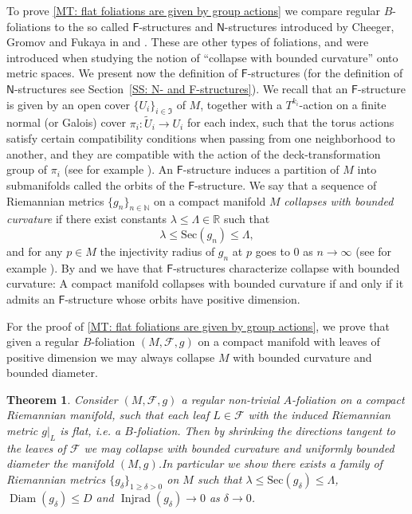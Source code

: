 \documentclass[12pt,a4paper,reqno]{amsart}
\newtheorem{mtheorem}{Theorem}
\theoremstyle{definition}
\numberwithin{equation}{section}
\newcommand{\fol}{\mathcal{F}}
\newcommand{\F}{\mathsf{F}}
\newcommand{\N}{\mathbb{N}} %
\newcommand{\Ns}{\mathsf{N}}
\newcommand{\R}{\mathbb{R}} %
\newcommand{\Sec}{\mathrm{Sec}}
\DeclareMathOperator{\diam}{Diam}
\DeclareMathOperator{\Inj}{Injrad}
\begin{document}
To prove \th\ref{MT: flat foliations are given by group actions} we compare regular $B$-foliations to the  so called $\F$-structures and $\Ns$-structures introduced by Cheeger, Gromov and Fukaya in \cite{CheegerGromov1986} and \cite{CheegerFukayaGromov1992}.  These are other types of foliations, and were introduced  when studying the notion of  ``collapse with bounded curvature'' onto metric spaces. We present now the definition of $\F$-structures (for the definition of $\Ns$-structures see Section~\ref{SS: N- and F-structures}). We recall that an $\F$-structure is given by an open cover $\{U_i\}_{i\in \mathfrak{I}}$ of $M$, together with a $T^{k_i}$-action on a finite  normal (or Galois) cover $\pi_i\colon \tilde{U}_i\to U_i$ for each index, such that the torus actions satisfy certain compatibility conditions when passing from one neighborhood to another, and they are compatible with the action of the deck-transformation group of $\pi_i$ (see for example \cite[Definition 19.2]{Fukaya1990}). An $\F$-structure induces a partition of $M$ into submanifolds called the orbits of the $\F$-structure. We say that a sequence of Riemannian metrics $\{g_n\}_{n\in \N}$ on a compact manifold $M$ \emph{collapses with bounded curvature} if there exist constants $\lambda\leq \Lambda\in \R$ such that
\[
\lambda\leq \Sec(g_n)\leq \Lambda,
\]
and for any $p\in M$ the injectivity radius of $g_n$ at $p$ goes to $0$ as $n\to \infty$ (see for example \cite[p. 69]{Pansu1985}). By \cite{CheegerGromov1986} and \cite{CheegerGromov1990} we have that $\F$-structures  characterize collapse with bounded curvature: A compact manifold collapses with bounded curvature if and only if it admits an $\F$-structure whose orbits have positive dimension. 

For the proof of \th\ref{MT: flat foliations are given by group actions}, we prove that given a regular $B$-foliation $(M,\fol,g)$ on a compact manifold with leaves of positive dimension we may always collapse $M$ with bounded curvature and bounded diameter.

\begin{mtheorem}\th\label{MT: Collapse of flat foliations}
Consider $(M,\fol,g)$ a regular non-trivial $A$-foliation on a compact Riemannian manifold, such that each leaf $L\in \fol$ with the induced Riemannian metric $g|_L$ is flat, i.e. a $B$-foliation. Then by shrinking the directions tangent to the leaves of $\fol$  we may collapse with bounded curvature and uniformly bounded diameter the manifold $(M,g)$.In particular we show there exists a family of Riemannian metrics $\{g_\delta\}_{1\geq\delta>0}$ on $M$ such that $\lambda\leq \Sec(g_\delta)\leq \Lambda$, $\diam(g_\delta)\leq D$ and $\Inj(g_\delta)\to 0$ as $\delta\to 0$. 
\end{mtheorem}
\end{document}
